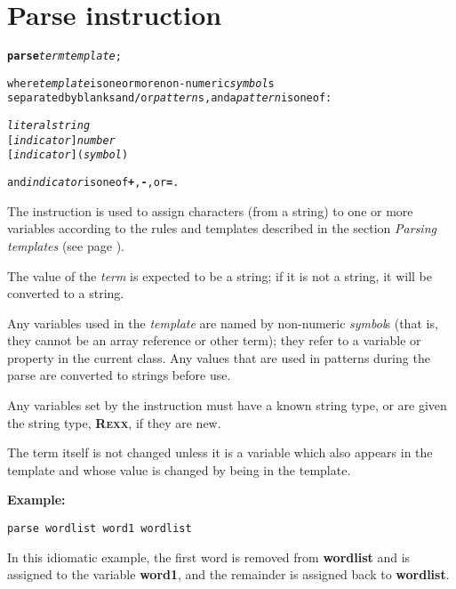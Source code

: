 \section{Parse instruction}\label{refparse}
\begin{shaded}
\begin{alltt}
\textbf{parse} \emph{term} \emph{template};

where \emph{template} is one or more non-numeric \emph{symbol}s
separated by blanks and/or \emph{pattern}s, and a \emph{pattern} is one of:

    \emph{literalstring}
    [\emph{indicator}] \emph{number}
    [\emph{indicator}] (\emph{symbol})

and \emph{indicator} is one of \textbf{+}, \textbf{-}, or \textbf{=}.
\end{alltt}
\end{shaded}
 The  instruction is used to assign characters (from a
string) to one or more variables according to the rules and templates
described in the section \emph{Parsing templates} (see page \pageref{refparsing}).
 
The value of the \emph{term} is expected to be a string; if it is
not a string, it will be converted to a string.
 
Any variables used in the \emph{template} are named by non-numeric
\emph{symbol}s (that is, they cannot be an array reference or other
term); they refer to a variable or property in the current class.
Any values that are used in patterns during the parse are converted to
strings before use.
 
Any variables set by the  instruction must have a known
string type, or are given the \nr{} string type, \textbf{R\textsc{exx}}, if
they are new.
 
The term itself is not changed unless it is a variable which also
appears in the template and whose value is changed by being in the
template.

\textbf{Example:}
\begin{lstlisting}
parse wordlist word1 wordlist
\end{lstlisting}
In this idiomatic example, the first word is removed
from \textbf{wordlist} and is assigned to the
variable \textbf{word1}, and the remainder is assigned back
to \textbf{wordlist}.

